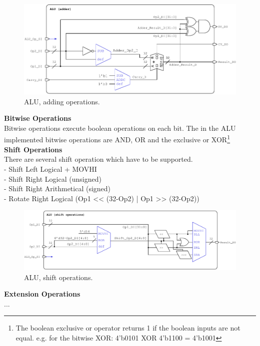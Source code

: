\begin{figure}[htbp]
  \centering
  \includegraphics[scale=0.95]{./figures/alu_add}
  \caption{ALU, adding operations.}
  \label{fig:alu_add}
\end{figure}

\textbf{Bitwise Operations} \\
Bitwise operations execute boolean operations on each bit. The in the ALU implemented bitwise operations are AND, OR and the exclusive or XOR\footnote{The boolean exclusive or operator returns 1 if the boolean inputs are not equal. e.g. for the bitwise XOR: 4'b0101 XOR 4'b1100 = 4'b1001} \\

\textbf{Shift Operations} \\
There are several shift operation which have to be supported. \\
- Shift Left Logical + MOVHI\\
- Shift Right Logical (unsigned) \\
- Shift Right Arithmetical (signed) \\
- Rotate Right Logical (Op1 << (32-Op2) | Op1 >> (32-Op2)) \\
\begin{figure}[htbp]
  \centering
  \includegraphics[scale=0.85]{./figures/alu_shift}
  \caption{ALU, shift operations.}
  \label{fig:alu_shift}
\end{figure}

\textbf{Extension Operations} \\
... \\

